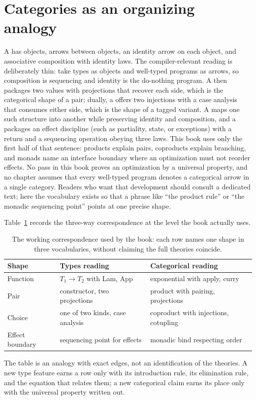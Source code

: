 \section{Categories as an organizing analogy}
\label{sec:app-d-categories}

A  has objects, arrows between objects, an identity arrow on each object, and associative composition with identity laws.
The compiler-relevant reading is deliberately thin: take types as objects and well-typed programs as arrows, so composition is sequencing and identity is the do-nothing program.
A  then packages two values with projections that recover each side, which is the categorical shape of a pair; dually, a  offers two injections with a case analysis that consumes either side, which is the shape of a tagged variant.
A  maps one such structure into another while preserving identity and composition, and a  packages an effect discipline (such as partiality, state, or exceptions) with a return and a sequencing operation obeying three laws.
This book uses only the first half of that sentence: products explain pairs, coproducts explain branching, and monads name an interface boundary where an optimization must not reorder effects.
No pass in this book proves an optimization by a universal property, and no chapter assumes that every well-typed program denotes a categorical arrow in a single category.
Readers who want that development should consult a dedicated text; here the vocabulary exists so that a phrase like \enquote{the product rule} or \enquote{the monadic sequencing point} points at one precise shape.

Table~\ref{tab:app-d-correspondence} records the three-way correspondence at the level the book actually uses.
\begin{table}
\centering
\caption{The working correspondence used by the book: each row names one shape in three vocabularies, without claiming the full theories coincide.}
\label{tab:app-d-correspondence}
\begin{tabular}{lll}
\toprule
Shape & Types reading & Categorical reading \\
\midrule
Function & $T_1 \to T_2$ with Lam, App & exponential with apply, curry \\
Pair & constructor, two projections & product with pairing, projections \\
Choice & one of two kinds, case analysis & coproduct with injections, cotupling \\
Effect boundary & sequencing point for effects & monadic bind respecting order \\
\bottomrule
\end{tabular}
\end{table}
The table is an analogy with exact edges, not an identification of the theories.
A new type feature earns a row only with its introduction rule, its elimination rule, and the equation that relates them; a new categorical claim earns its place only with the universal property written out.

